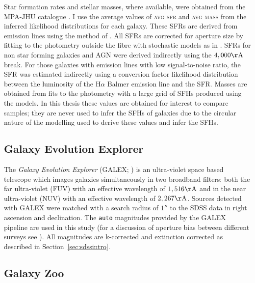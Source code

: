 Star formation rates and stellar masses, where available, were obtained from the MPA-JHU catalogue \citep{kauffmann03, brinchmann04}.  I use the average values of \textsc{avg sfr} and \textsc{avg mass} from the inferred likelihood distributions for each galaxy. These SFRs are derived from emission lines using the method of \cite{charlot01}. All SFRs are corrected for aperture size by fitting to the photometry outside the fibre with stochastic models as in \cite{Salim07}. SFRs for non star forming galaxies and AGN were derived indirectly using the $4,000\rm{\AA}$ break. For those galaxies with emission lines with low signal-to-noise ratio, the SFR was estimated indirectly using a conversion factor likelihood distribution between the luminosity of the H$\alpha$ Balmer emission line and the SFR. Masses are obtained from fits to the photometry with a large grid of SFHs produced using the \cite{BC03} models. In this thesis these values are obtained for interest to compare samples; they are never used to infer the SFHs of galaxies due to the circular nature of the modelling used to derive these values and infer the SFHs.

\subsection{Galaxy Evolution Explorer}\label{sec:galexintro}

The \emph{Galaxy Evolution Explorer} (GALEX; \citealt{Martin05}) is an ultra-violet space based telescope which images galaxies simultaneously in two broadband filters: both the far ultra-violet (FUV) with an effective wavelength of $1,516\rm{\AA}$ and in the near ultra-violet (NUV) with an effective wavelength of $2,267\rm{\AA}$. Sources detected with GALEX were matched with a search radius of $1''$ to the SDSS data in right ascension and declination. The {\tt auto} magnitudes provided by the GALEX pipeline are used in this study (for a discussion of aperture bias between different surveys see \citealt{hill11}). All magnitudes are k-corrected and extinction corrected as described in Section~\ref{sec:sdssintro}.

\subsection{Galaxy Zoo}\label{sec:GZ}

